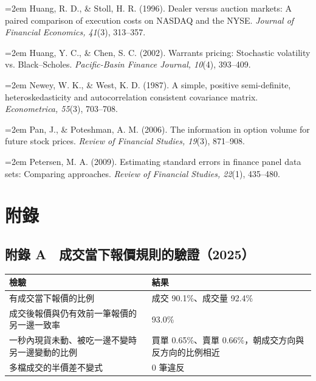 \documentclass[12pt,a4paper]{article}
\begin{document}
\noindent\hangindent=2em Huang, R. D., \& Stoll, H. R. (1996). Dealer versus auction markets: A paired comparison of execution costs on NASDAQ and the NYSE. \textit{Journal of Financial Economics, 41}(3), 313–357.\par

\noindent\hangindent=2em Huang, Y. C., \& Chen, S. C. (2002). Warrants pricing: Stochastic volatility vs. Black–Scholes. \textit{Pacific-Basin Finance Journal, 10}(4), 393–409.\par

\noindent\hangindent=2em Newey, W. K., \& West, K. D. (1987). A simple, positive semi-definite, heteroskedasticity and autocorrelation consistent covariance matrix. \textit{Econometrica, 55}(3), 703–708.\par

\noindent\hangindent=2em Pan, J., \& Poteshman, A. M. (2006). The information in option volume for future stock prices. \textit{Review of Financial Studies, 19}(3), 871–908.\par

\noindent\hangindent=2em Petersen, M. A. (2009). Estimating standard errors in finance panel data sets: Comparing approaches. \textit{Review of Financial Studies, 22}(1), 435–480.\par


\clearpage
\section*{附錄}

\subsection*{附錄 A　成交當下報價規則的驗證（2025）}

\begin{center}\small
\begin{tabularx}{\linewidth}{YY}
\toprule
\textbf{檢驗} & \textbf{結果} \\
\midrule
有成交當下報價的比例 & 成交 90.1\%、成交量 92.4\% \\
成交後報價與仍有效前一筆報價的另一邊一致率 & 93.0\% \\
一秒內現貨未動、被吃一邊不變時另一邊變動的比例 & 買單 0.65\%、賣單 0.66\%，朝成交方向與反方向的比例相近 \\
多檔成交的半價差不變式 & 0 筆違反 \\
\bottomrule
\end{tabularx}
\end{center}
\end{document}

